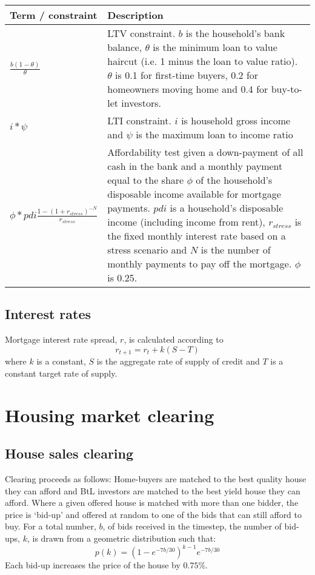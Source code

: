 \documentclass{article}
\begin{document}
\noindent \bigskip 
\begin{tabular}{p{1.5in}|p{4in}}
Term / constraint & Description \\ \hline\hline
$\frac{b(1-\theta )}{\theta }$ & LTV constraint. $b$ is the household's bank
balance, $\theta $ is the minimum loan to value haircut (i.e. 1 minus the
loan to value ratio). $\theta $ is 0.1 for first-time buyers, 0.2 for
homeowners moving home and 0.4 for buy-to-let investors. \\ 
$i\ast \psi $ & LTI constraint. $i$ is household gross income and $\psi $ is
the maximum loan to income ratio \\ 
$\phi \ast pdi\frac{1-(1+r_{stress})^{-N}}{r_{stress}}$ & Affordability test
given a down-payment of all cash in the bank and a monthly payment equal to
the share $\phi $ of the household's disposable income available for
mortgage payments. $pdi$ is a household's disposable income (including
income from rent), $r_{stress}$ is the fixed monthly interest rate based on
a stress scenario and $N$ is the number of monthly payments to pay off the
mortgage. $\phi $ is 0.25.%
\end{tabular}

\subsection{Interest rates}
Mortgage interest rate spread, $r$, is calculated according to
\[
r_{t+1} = r_{t} + k(S-T)
\]
where $k$ is a constant, $S$ is the aggregate rate of supply of credit and $T$ is a constant target rate of supply.

\section{Housing market clearing}

\subsection{House sales clearing}

Clearing proceeds as follows: Home-buyers are matched to the best quality
house they can afford and BtL investors are matched to the best yield house
they can afford. Where a given offered house is matched with more than one
bidder, the price is `bid-up' and offered at random to one of the bids that
can still afford to buy. For a total number, $b$, of bids received in the timestep, the number of bid-ups, $k$, is drawn from a geometric distribution such that:
\[
p(k) = (1-e^{-7b/30})^{k-1}e^{-7b/30}
\]
Each bid-up increases the price of the house by $0.75\%$.
\end{document}
